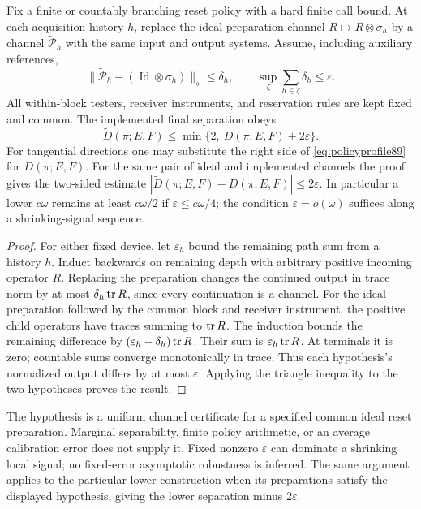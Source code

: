 \begin{proposition}\label{prop:approxreset89}
Fix a finite or countably branching reset policy with a hard finite
call bound.  At each acquisition history $h$, replace the ideal
preparation channel $R\mapsto R\otimes\sigma_h$ by a channel
$\widetilde{\mathcal P}_h$ with the same input and output systems.
Assume, including auxiliary references,
\[
 \|\widetilde{\mathcal P}_h-(\operatorname{Id}\otimes\sigma_h)
                      \|_\diamond\le\delta_h,\qquad
 \sup_\zeta\sum_{h\in\zeta}\delta_h\le\varepsilon.
\]
All within-block testers, receiver instruments, and reservation rules
are kept fixed and common.  The implemented final separation obeys
\begin{equation}\label{eq:approxreset89}
 \widetilde D(\pi;E,F)
 \le\min\{2,\ D(\pi;E,F)+2\varepsilon\}.
\end{equation}
For tangential directions one may substitute the right side of
\eqref{eq:policyprofile89} for $D(\pi;E,F)$.
For the same pair of ideal and implemented channels the proof gives the
two-sided estimate $|\widetilde D(\pi;E,F)-D(\pi;E,F)|\le2\varepsilon$.
In particular a lower $c\omega$ remains at least $c\omega/2$ if
$\varepsilon\le c\omega/4$; the condition $\varepsilon=o(\omega)$
suffices along a shrinking-signal sequence.
\end{proposition}
\begin{proof}
For either fixed device, let $\varepsilon_h$ bound the remaining
path sum from a history $h$.  Induct backwards on remaining depth
with arbitrary positive incoming operator $R$.  Replacing the
preparation changes the continued output in trace norm by at most
$\delta_h\operatorname{tr} R$, since every continuation is a channel.  For the
ideal preparation followed by the common block and receiver
instrument, the positive child operators have traces summing to
$\operatorname{tr} R$.  The induction bounds the remaining difference by
$(\varepsilon_h-\delta_h)\operatorname{tr} R$.  Their sum is
$\varepsilon_h\operatorname{tr} R$.  At terminals it is zero; countable sums
converge monotonically in trace.  Thus each hypothesis's normalized
output differs by at most $\varepsilon$.  Applying the triangle
inequality to the two hypotheses proves the result.
\end{proof}

The hypothesis is a uniform channel certificate for a specified
common ideal reset preparation.  Marginal separability, finite
policy arithmetic, or an average calibration error does not supply
it.  Fixed nonzero $\varepsilon$ can dominate a shrinking local
signal; no fixed-error asymptotic robustness is inferred.  The same
argument applies to the particular lower construction when its
preparations satisfy the displayed hypothesis, giving the lower
separation minus $2\varepsilon$.

